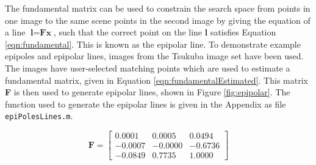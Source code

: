 \documentclass[a4paper, 10pt, conference]{ieeeconf}
\begin{document}
The fundamental matrix can be used to constrain the search space from points in one image to the same scene points in the second image by giving the equation of a line $\textbf{l}=\textbf{Fx}$, such that the correct point on the line \textbf{l} satisfies Equation \ref{eqn:fundamental}. This is known as the epipolar line. To demonstrate example epipoles and epipolar lines, images from the Tsukuba image set \cite{tsukuba} have been used. The images have user-selected matching points which are used to estimate a fundamental matrix, given in Equation \ref{eqn:fundamentalEstimated}. This matrix \textbf{F} is then used to generate epipolar lines, shown in Figure \ref{fig:epipolar}. The function used to generate the epipolar lines is given in the Appendix as file \texttt{epiPolesLines.m}.

\begin{equation} \label{eqn:fundamentalEstimated}
\textbf{F} = \begin{bmatrix}
     0.0001 &  0.0005 &  0.0494 \\
    -0.0007 & -0.0000 & -0.6736 \\
    -0.0849 &  0.7735 &  1.0000
\end{bmatrix}
\end{equation}
\end{document}
